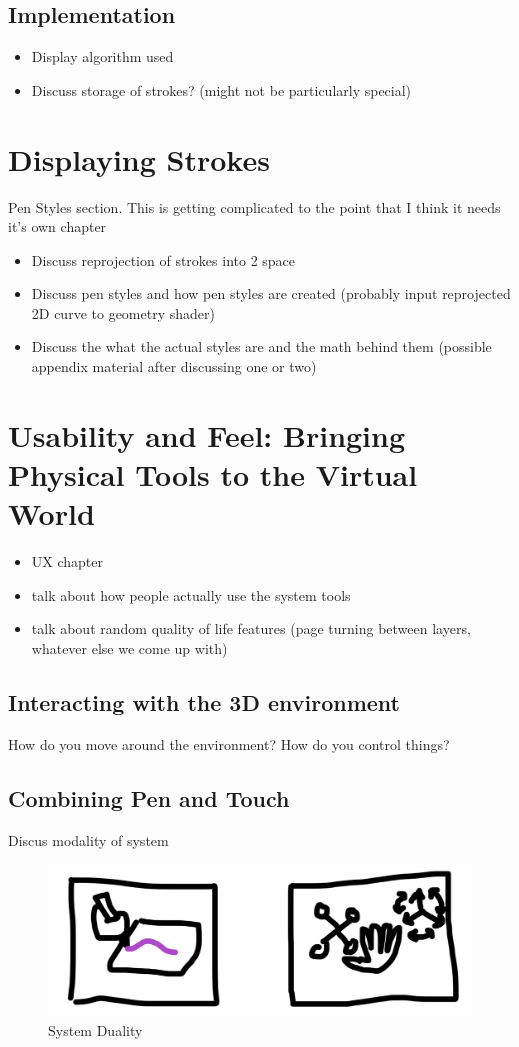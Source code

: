 \documentclass[12pt]{article}
\begin{document}
\subsection{Implementation}
\begin{itemize}
\item Display algorithm used
\item Discuss storage of strokes? (might not be particularly special)
\end{itemize}

\pagebreak
\section{Displaying Strokes}
Pen Styles section. This is getting complicated to the point that I think it needs it's own chapter
\begin{itemize}
\item Discuss reprojection of strokes into 2 space
\item Discuss pen styles and how pen styles are created (probably input reprojected 2D curve to geometry shader)
\item Discuss the what the actual styles are and the math behind them (possible appendix material after discussing one or two)
\end{itemize}
\pagebreak
\section{Usability and Feel: Bringing Physical Tools to the Virtual World}
\begin{itemize}
\item UX chapter
\item talk about how people actually use the system tools
\item talk about random quality of life features (page turning between layers, whatever else we come up with)
\end{itemize}
\subsection{Interacting with the 3D environment}
How do you move around the environment? How do you control things?
\subsection{Combining Pen and Touch}
Discus modality of system
\begin{figure}[h]
\includegraphics[width=0.9\linewidth]{Duality}
\caption{System Duality}
\end{figure}
\end{document}
